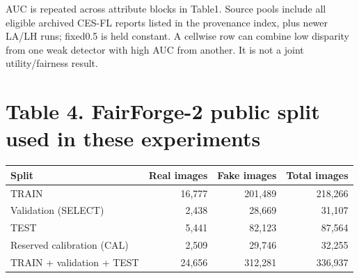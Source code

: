 \documentclass[10pt]{article}
\newcommand{\note}[1]{{\fontsize{8}{10}\selectfont #1\par}}
\begin{document}
\note{AUC is repeated across attribute blocks in Table1. Source pools include all eligible archived CES-FL reports listed in the provenance index, plus newer LA/LH runs; fixed0.5 is held constant. A cellwise row can combine low disparity from one weak detector with high AUC from another. It is not a joint utility/fairness result.}
\clearpage\section*{Table 4. FairForge-2 public split used in these experiments}
{\fontsize{12}{13.5}\selectfont\setlength{\tabcolsep}{3pt}
\renewcommand{\arraystretch}{1.05}
\begin{tabular*}{\linewidth}{@{\extracolsep{\fill}}lrrr}\toprule
Split & Real images & Fake images & Total images\\\midrule
TRAIN & 16,777 & 201,489 & 218,266\\
Validation (SELECT) & 2,438 & 28,669 & 31,107\\
TEST & 5,441 & 82,123 & 87,564\\
Reserved calibration (CAL) & 2,509 & 29,746 & 32,255\\
\midrule TRAIN + validation + TEST & 24,656 & 312,281 & 336,937\\
\bottomrule\end{tabular*}}\par
\end{document}
